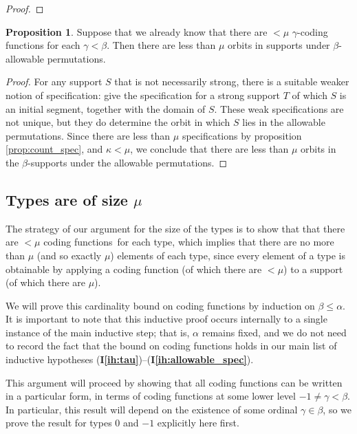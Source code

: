 \documentclass{article}
\theoremstyle{definition}
\newtheorem{proposition}[theorem]{Proposition}
\theoremstyle{remark}
\newcommand{\ihref}[1]{(\textbf{I\ref{#1}})}
\begin{document}
{\begin{proof}
\end{proof}

\begin{proposition}\label{prop:count_support_orbits}
  Suppose that we already know that there are $<\mu$ $\gamma$-coding functions for each $\gamma<\beta$.
  Then there are less than $\mu$ orbits in supports under $\beta$-allowable permutations.
\end{proposition}
\begin{proof}
For any support $S$ that is not necessarily strong, there is a suitable weaker notion of specification: give the specification for a strong support $T$ of which $S$ is an initial segment, together with the domain of $S$.
These weak specifications are not unique, but they do determine the orbit in which $S$ lies in the allowable permutations.
Since there are less than $\mu$ specifications by proposition \ref{prop:count_spec}, and $\kappa < \mu$, we conclude that there are less than $\mu$ orbits in the $\beta$-supports under the allowable permutations.
\end{proof}

\subsection{Types are of size $\mu$}

The strategy of our argument for the size of the types is to show that that there are $<\mu$ coding functions\ for each type, which implies that there are no more than $\mu$ (and so exactly $\mu$) elements of each type, since every element of a type is obtainable by applying a coding function (of which there are $<\mu$) to a support (of which there are $\mu$).


We will prove this cardinality bound on coding functions by induction on $\beta \leq \alpha$.
It is important to note that this inductive proof occurs internally to a single instance of the main inductive step; that is, $\alpha$ remains fixed, and we do not need to record the fact that the bound on coding functions holds in our main list of inductive hypotheses \ihref{ih:tau}--\ihref{ih:allowable_spec}.


This argument will proceed by showing that all coding functions can be written in a particular form, in terms of coding functions at some lower level $-1 \neq \gamma < \beta$.
In particular, this result will depend on the existence of some ordinal $\gamma \in \beta$, so we prove the result for types 0 and $-1$ explicitly here first.

}
\end{document}
